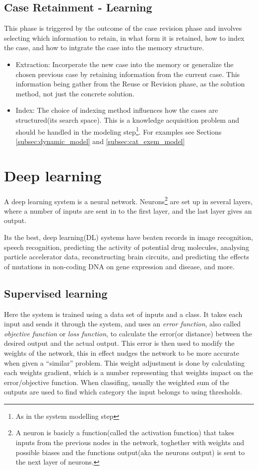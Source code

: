 \documentclass[11pt, letterpaper]{report}
\numberwithin{equation}{section}
\begin{document}
\section{Case Retainment - Learning}
This phase is triggered by the outcome of the case revision phase and involves
selecting which information to retain, in what form it is retained, how to index
the case, and how to intgrate the case into the memory structure.
\begin{itemize}
\item Extraction: Incorperate the new case into the memory or generalize the
  chosen previous case by retaining information from the current case. This
  information being gather from the Reuse or Revision phase, as the solution
  method, not just the concrete solution.
\item Index: The choice of indexing method influences how the cases are
  structured(its search space). This is a knowledge acquisition problem and
  should be handled in the modeling step\footnote{As in the system modelling
    step}. For examples see Sections \ref{subsec:dynamic_model} and \ref{subsec:cat_exem_model}
\end{itemize}

\setcounter{section}{0}
\chapter{Deep learning}
A deep learning system is a neural network. Neurons\footnote{A neuron is basicly a
  function(called the activation function) that takes inputs from the previous
  nodes in the network, toghether with weights and possible biases and the
  functions output(aka the neurons output) is sent to the next layer of
  neurons.} are set up in several layers, where a number of inputs are sent in
to the first layer, and the last layer gives an output.

Its the best, deep learning(DL) systems have beaten records in image
recognition, speech recognition, predicting the activity of potential drug
molecules, analysing particle accelerator data, reconstructing brain circuits,
and predicting the effects of mutations in non-coding DNA on gene expression and
disease, and more.

\section{Supervised learning}
Here the system is trained using a data set of inputs and a class. It takes each
input and sends it through the system, and uses an \emph{error function},
also called \emph{objective function} or \emph{loss function}, to
calculate the error(or distance) between the desired output and the actual
output. This error is then used to modify the weights of the network, this in
effect nudges the network to be more accurate when given a ``similar'' problem.
This weight adjustment is done by calculating each weights gradient, which is a number
representing that weights impact on the error/objective function. When
classifing, usually the weighted sum of the outputs are used to find which
category the input belongs to using thresholds.
\end{document}
